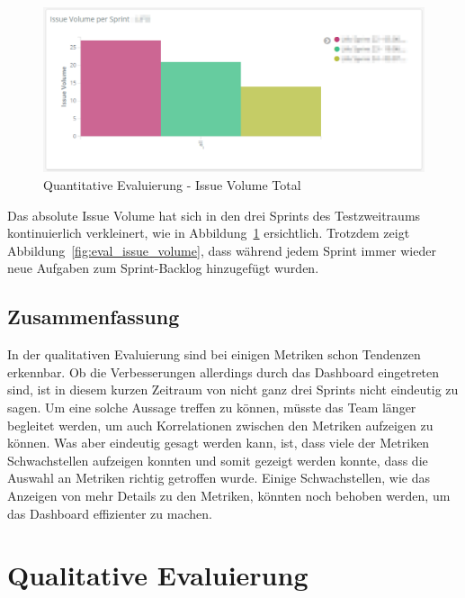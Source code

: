 \begin{savenotes}
    \begin{figure}[H]
      \centering
      \includegraphics[width=1.0\textwidth]{img/eval-volume-total.png}
      \caption{Quantitative Evaluierung {-} Issue Volume Total}\label{fig:eval_issue_volume_total}
    \end{figure}
\end{savenotes}

Das absolute Issue Volume hat sich in den drei Sprints des Testzweitraums kontinuierlich verkleinert, wie in Abbildung~\ref{fig:eval_issue_volume_total} ersichtlich.
Trotzdem zeigt Abbildung~\ref{fig:eval_issue_volume}, dass während jedem Sprint immer wieder neue Aufgaben zum Sprint-Backlog hinzugefügt wurden.

\clearpage
\subsection*{Zusammenfassung}

In der qualitativen Evaluierung sind bei einigen Metriken schon Tendenzen erkennbar.
Ob die Verbesserungen allerdings durch das Dashboard eingetreten sind, ist in diesem kurzen Zeitraum von nicht ganz drei Sprints nicht eindeutig zu sagen.
Um eine solche Aussage treffen zu können, müsste das Team länger begleitet werden, um auch Korrelationen zwischen den Metriken aufzeigen zu können.
Was aber eindeutig gesagt werden kann, ist, dass viele der Metriken Schwachstellen aufzeigen konnten und somit gezeigt werden konnte, dass die Auswahl an Metriken richtig getroffen wurde.
Einige Schwachstellen, wie das Anzeigen von mehr Details zu den Metriken, könnten noch behoben werden, um das Dashboard effizienter zu machen.

\clearpage
\section{Qualitative Evaluierung}

